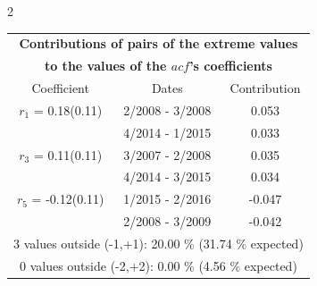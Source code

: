 
\thispagestyle{empty}
\begin{multicols}{2}{ 
\begin{tabular}{ccc}
\multicolumn{3}{c}{\textbf{Contributions of pairs of the extreme values} }  \vspace{-.10in}  \\ 
\multicolumn{3}{c}{ \textbf{to the values of the $acf$'s coefficients}} \\ 
\hline 
\hline                  Coefficient  &  Dates &  Contribution \\ 
\hline 
  $r_{ 1}$ = 0.18(0.11) &       2/2008 -  3/2008 &        0.053   \vspace{-.10in} \\  
&        4/2014 -  1/2015 &        0.033  \vspace{-.02in} \\ \hline 
  $r_{ 3}$ = 0.11(0.11) &       3/2007 -  2/2008 &        0.035   \vspace{-.10in} \\  
&        4/2014 -  3/2015 &        0.034  \vspace{-.02in} \\ \hline 
  $r_{ 5}$ = -0.12(0.11) &       1/2015 -  2/2016 &       -0.047    \vspace{-.10in} \\ 
  &        2/2008 -  3/2009 &       -0.042  \vspace{-.02in}   \\ \hline 
  \multicolumn{3}{c}{               3 values outside (-1,+1): 20.00  \% (31.74  \% expected)}\vspace{-.10in} \\ 
\multicolumn{3}{c}{               0 values outside (-2,+2):  0.00 \%  (4.56 \% expected) } \\
 \end{tabular} \\ 
 } 
\end{multicols} 

